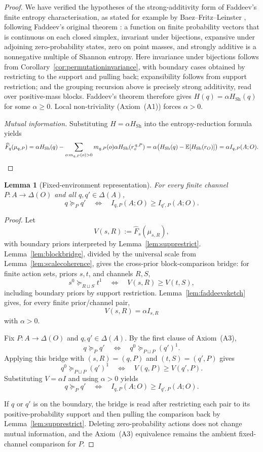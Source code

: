 \documentclass[11pt,a4paper]{article}
\newtheorem{lemma}[theorem]{Lemma}
\theoremstyle{definition}
\newcommand{\Sh}{H_{\mathrm{Sh}}}
\newcommand{\E}{\mathbb E}
\newcommand{\1}{\mathbf 1}
\begin{document}
\begin{proof}
We have verified the hypotheses of the strong-additivity form of Faddeev's finite entropy characterisation, as stated
for example by Baez--Fritz--Leinster \cite[Theorem~6]{BaezFritzLeinster2011}, following Faddeev's original theorem
\cite{Faddeev1956}: a function on finite probability vectors that is continuous on each closed simplex, invariant under
bijections, expansive under adjoining zero-probability states, zero on point masses, and strongly additive is a
nonnegative multiple of Shannon entropy.  Here invariance under bijections follows from
Corollary~\ref{cor:permutationinvariance}, with boundary cases obtained by restricting to the support and pulling back;
expansibility follows from support restriction; and the grouping recursion above is precisely strong additivity, read
over positive-mass blocks.  Faddeev's theorem therefore gives $H(q)=\alpha\Sh(q)$ for some $\alpha\ge0$.
Local non-triviality (Axiom~\textup{(A1)}) forces $\alpha>0$.

\emph{Mutual information.}  Substituting $H=\alpha\Sh$ into the entropy-reduction formula yields
\[
\widehat F_q(\mu_{q,P})
=\alpha\Sh(q)-\sum_{o:m_{q,P}(o)>0}m_{q,P}(o)\alpha\Sh(r_o^{\,q,P})
=\alpha\bigl(\Sh(q)-\E[\Sh(r_O)]\bigr)
=\alpha I_{q,P}(A;O).
\qedhere
\]
\end{proof}

\begin{lemma}[Fixed-environment representation]\label{lem:globalsketch}
For every finite channel $P:A\to\Delta(O)$ and all $q,q'\in\Delta(A)$,
\[
q\succeq_P q'
\quad\Longleftrightarrow\quad
I_{q,P}(A;O)\ge I_{q',P}(A;O).
\]
\end{lemma}

\begin{proof}
Let
\[
V(s,R):=\widehat F_s(\mu_{s,R}),
\]
with boundary priors interpreted by Lemma~\ref{lem:supprestrict}.  Lemma~\ref{lem:blockbridge}, divided by the universal
scale from Lemma~\ref{lem:scalecoherence}, gives the cross-prior block-comparison bridge: for finite action sets,
priors $s,t$, and channels $R,S$,
\[
s^0\succeq_{R\sqcup S}t^1
\quad\Longleftrightarrow\quad
V(s,R)\ge V(t,S),
\]
including boundary priors by support restriction.  Lemma~\ref{lem:faddeevsketch} gives, for every finite
prior/channel pair,
\[
V(s,R)=\alpha I_{s,R}
\]
with $\alpha>0$.

Fix $P:A\to\Delta(O)$ and $q,q'\in\Delta(A)$.  By the first clause of Axiom~\textup{(A3)},
\[
q\succeq_P q'
\quad\Longleftrightarrow\quad
q^0\succeq_{P\sqcup P}(q')^1.
\]
Applying this bridge with $(s,R)=(q,P)$ and $(t,S)=(q',P)$ gives
\[
q^0\succeq_{P\sqcup P}(q')^1
\quad\Longleftrightarrow\quad
V(q,P)\ge V(q',P).
\]
Substituting $V=\alpha I$ and using $\alpha>0$ yields
\[
q\succeq_P q'
\quad\Longleftrightarrow\quad
I_{q,P}(A;O)\ge I_{q',P}(A;O).
\]

If $q$ or $q'$ is on the boundary, the bridge is read after restricting each pair to its positive-probability support
and then pulling the comparison back by Lemma~\ref{lem:supprestrict}.  Deleting
zero-probability actions does not change mutual information, and the Axiom~\textup{(A3)} equivalence remains the ambient
fixed-channel comparison for $P$.
\end{proof}
\end{document}
